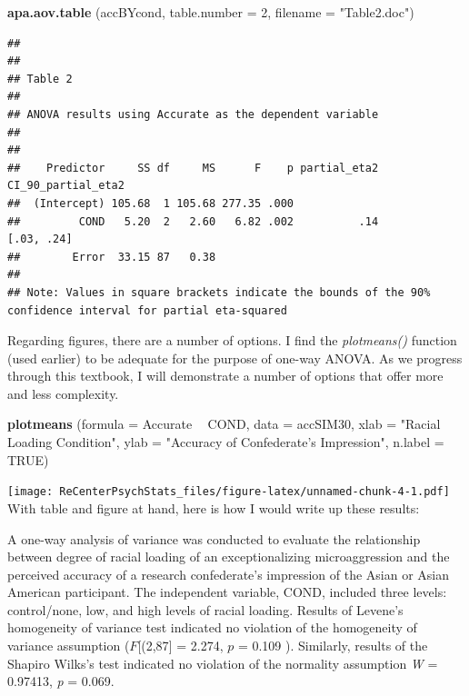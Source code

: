 \documentclass[
  english,
]{book}
\newenvironment{Shaded}{\begin{snugshade}}{\end{snugshade}}
\newcommand{\DataTypeTok}[1]{\textcolor[rgb]{0.13,0.29,0.53}{#1}}
\newcommand{\DecValTok}[1]{\textcolor[rgb]{0.00,0.00,0.81}{#1}}
\newcommand{\KeywordTok}[1]{\textcolor[rgb]{0.13,0.29,0.53}{\textbf{#1}}}
\newcommand{\NormalTok}[1]{#1}
\newcommand{\OperatorTok}[1]{\textcolor[rgb]{0.81,0.36,0.00}{\textbf{#1}}}
\newcommand{\OtherTok}[1]{\textcolor[rgb]{0.56,0.35,0.01}{#1}}
\newcommand{\StringTok}[1]{\textcolor[rgb]{0.31,0.60,0.02}{#1}}
\begin{document}
\begin{Shaded}
\begin{Highlighting}[]
\KeywordTok{apa.aov.table}\NormalTok{ (accBYcond, }\DataTypeTok{table.number =} \DecValTok{2}\NormalTok{, }\DataTypeTok{filename =} \StringTok{"Table2.doc"}\NormalTok{)}
\end{Highlighting}
\end{Shaded}

\begin{verbatim}
## 
## 
## Table 2 
## 
## ANOVA results using Accurate as the dependent variable
##  
## 
##    Predictor     SS df     MS      F    p partial_eta2 CI_90_partial_eta2
##  (Intercept) 105.68  1 105.68 277.35 .000                                
##         COND   5.20  2   2.60   6.82 .002          .14         [.03, .24]
##        Error  33.15 87   0.38                                            
## 
## Note: Values in square brackets indicate the bounds of the 90% confidence interval for partial eta-squared
\end{verbatim}

Regarding figures, there are a number of options. I find the \emph{plotmeans()} function (used earlier) to be adequate for the purpose of one-way ANOVA. As we progress through this textbook, I will demonstrate a number of options that offer more and less complexity.

\begin{Shaded}
\begin{Highlighting}[]
\KeywordTok{plotmeans}\NormalTok{ (}\DataTypeTok{formula =}\NormalTok{ Accurate }\OperatorTok{~}\StringTok{ }\NormalTok{COND, }\DataTypeTok{data =}\NormalTok{ accSIM30, }\DataTypeTok{xlab =} \StringTok{"Racial Loading Condition"}\NormalTok{, }\DataTypeTok{ylab =} \StringTok{"Accuracy of Confederate's Impression"}\NormalTok{, }\DataTypeTok{n.label =} \OtherTok{TRUE}\NormalTok{)}
\end{Highlighting}
\end{Shaded}

\texttt{[image: ReCenterPsychStats\_files/figure-latex/unnamed-chunk-4-1.pdf]}
With table and figure at hand, here is how I would write up these results:

A one-way analysis of variance was conducted to evaluate the relationship between degree of racial loading of an exceptionalizing microaggression and the perceived accuracy of a research confederate's impression of the Asian or Asian American participant. The independent variable, COND, included three levels: control/none, low, and high levels of racial loading. Results of Levene's homogeneity of variance test indicated no violation of the homogeneity of variance assumption (\(F\){[}(2,87{]} = 2.274, \(p\) = 0.109 ). Similarly, results of the Shapiro Wilks's test indicated no violation of the normality assumption \emph{W} = 0.97413, \emph{p} = 0.069.
\end{document}
